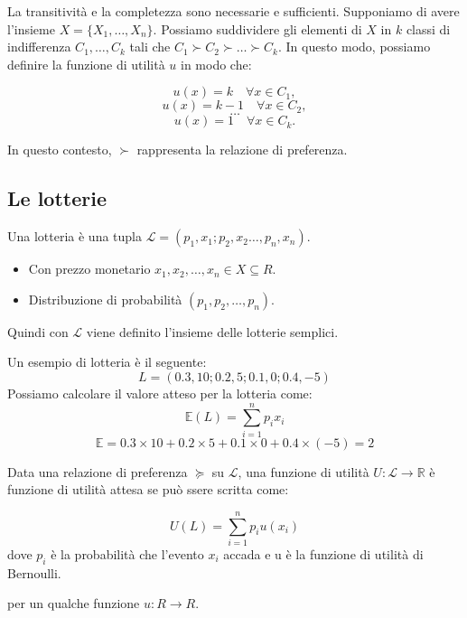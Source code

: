 \begin{dimostrazione}
\end{dimostrazione}

La transitività e la completezza sono necessarie e sufficienti. Supponiamo di
avere l'insieme $X = \{X_1, \ldots, X_n\}$. Possiamo suddividere gli elementi
di $X$ in $k$ classi di indifferenza $C_1, \ldots, C_k$ tali che $C_1 \succ C_2
    \succ \ldots \succ C_k$. In questo modo, possiamo definire la funzione di
utilità $u$ in modo che:

\[
    u(x) = k \quad \forall x \in C_1,
\]
\[
    u(x) = k-1 \quad \forall x \in C_2,
\]
\[
    \ldots
\]
\[
    u(x) = 1 \quad \forall x \in C_k.
\]

In questo contesto, $\succ$ rappresenta la relazione di preferenza.

\subsection{Le lotterie}

Una lotteria è una tupla $\mathcal{L} = (p_1,x_1;p_2,x_2 \ldots, p_n,x_n)$.

\begin{itemize}
    \item Con prezzo monetario $x_1,x_2, \dots, x_n \in X \subseteq R$.
    \item Distribuzione di probabilità $(p_1, p_2, \dots, p_n)$.
\end{itemize}

Quindi con $\mathcal{L}$ viene definito l'insieme delle lotterie semplici.

Un esempio di lotteria è il seguente:
\[
    L = (0.3,10; 0.2,5; 0.1,0; 0.4,-5)\]
Possiamo calcolare il valore atteso per la lotteria come:
\[
    \mathbb{E}(L) = \sum_{i=1}^n {p_i}{x_i}
\]
\[
    \mathbb{E} = 0.3 \times 10 + 0.2 \times 5 + 0.1 \times 0 + 0.4 \times (-5) = 2
\]

\begin{definition}
    Data una relazione di preferenza $\succcurlyeq$ su $\mathcal{L}$, una funzione di utilità $U: \mathcal{L} \rightarrow \mathbb{R}$ è
    funzione di utilità attesa se può ssere scritta come:
\end{definition}

\[
    U(L) = \sum_{i=1}^n{p_i}u(x_i)
\]
dove $p_i$ è la probabilità che l'evento $x_i$ accada e u è la funzione di
utilità di Bernoulli.

per un qualche funzione $u:R \rightarrow R$.

